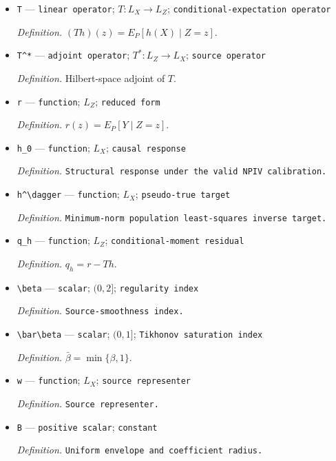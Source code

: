 \documentclass{article}
\begin{document}
\begin{itemize}
  \item \texttt{T} --- \texttt{linear operator}; \(T:L_X\to L_Z\); \texttt{conditional-\allowbreak{}expectation operator}
  \par\smallskip\noindent\emph{Definition.} \((Th)(z)=E_P[h(X)\mid Z=z]\).
  \item \texttt{T\textasciicircum{}*} --- \texttt{adjoint operator}; \(T^*:L_Z\to L_X\); \texttt{source operator}
  \par\smallskip\noindent\emph{Definition.} Hilbert-space adjoint of \(T\).
  \item \texttt{r} --- \texttt{function}; \(L_Z\); \texttt{reduced form}
  \par\smallskip\noindent\emph{Definition.} \(r(z)=E_P[Y\mid Z=z]\).
  \item \texttt{h\_\allowbreak{}0} --- \texttt{function}; \(L_X\); \texttt{causal response}
  \par\smallskip\noindent\emph{Definition.} \texttt{Structural response under the valid NPIV calibration.}
  \item \texttt{h\textasciicircum{}\textbackslash{}\allowbreak{}dagger} --- \texttt{function}; \(L_X\); \texttt{pseudo-\allowbreak{}true target}
  \par\smallskip\noindent\emph{Definition.} \texttt{Minimum-\allowbreak{}norm population least-\allowbreak{}squares inverse target.}
  \item \texttt{q\_\allowbreak{}h} --- \texttt{function}; \(L_Z\); \texttt{conditional-\allowbreak{}moment residual}
  \par\smallskip\noindent\emph{Definition.} \(q_h=r-Th\).
  \item \texttt{\textbackslash{}\allowbreak{}beta} --- \texttt{scalar}; \((0,2]\); \texttt{regularity index}
  \par\smallskip\noindent\emph{Definition.} \texttt{Source-\allowbreak{}smoothness index.}
  \item \texttt{\textbackslash{}\allowbreak{}bar\textbackslash{}\allowbreak{}beta} --- \texttt{scalar}; \((0,1]\); \texttt{Tikhonov saturation index}
  \par\smallskip\noindent\emph{Definition.} \(\bar\beta=\min\{\beta,1\}\).
  \item \texttt{w} --- \texttt{function}; \(L_X\); \texttt{source representer}
  \par\smallskip\noindent\emph{Definition.} \texttt{Source representer.}
  \item \texttt{B} --- \texttt{positive scalar}; \texttt{constant}
  \par\smallskip\noindent\emph{Definition.} \texttt{Uniform envelope and coefficient radius.}

\end{itemize}
\end{document}
